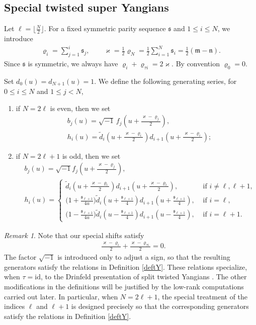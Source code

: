 \documentclass[11pt,reqno]{amsart}
\numberwithin{equation}{section}
\theoremstyle{definition}
\theoremstyle{remark}
\newtheorem{rem}[thm]{Remark}
\newcommand{\fkn}{\mathfrak{n}}
\newcommand{\fkm}{\mathfrak{m}}
\newcommand{\tl}{\tilde}
\newcommand{\lle}{\leqslant}
\newcommand{\ka}{{\mathfrak s}}
\begin{document}
\subsection{Special twisted super Yangians}\label{sec:hb}
Let $\ell=\lfloor\frac{N}{2}\rfloor$. For a fixed symmetric parity sequence $\bm\ka$ and $1\lle i\lle N$, we introduce
\begin{align}\label{eq:rho}
\varrho_i=\sum_{j=1}^i \ka_j,\qquad \varkappa=\frac12\varrho_N=\frac12\sum_{i=1}^N \ka_i=\frac12(\fkm-\fkn).
\end{align}
Since $\bm\ka$ is symmetric, we always have $\varrho_i+\varrho_{\tau i}=2\varkappa$. By convention $\varrho_0=0$.

Set $d_0(u)=d_{N+1}(u)=1$. We define the following generating series, for $0\lle i\lle N$ and $1\lle j< N$,
\begin{enumerate}
    \item if $N=2\ell$ is even, then we set
\begin{align}
& b_j(u)= \sqrt{-1}\,f_j(u+\tfrac{\varkappa-\varrho_j}{2}),\label{beven}\\
& h_i(u)=\tl d_{i}(u+\tfrac{\varkappa-\varrho_i}{2})d_{i+1}(u+\tfrac{\varkappa-\varrho_i}{2})\label{heven};
\end{align}
\item if $N=2\ell+1$ is odd, then we set
\begin{align}
&b_j(u)= \sqrt{-1}f_j(u+\tfrac{\varkappa-\varrho_j}{2}),\label{bodd}\\
&h_i(u)=
\begin{cases}
\tl d_{i}(u+\tfrac{\varkappa-\varrho_i}{2})d_{i+1}(u+\tfrac{\varkappa-\varrho_i}{2}), &\text{ if } i\ne \ell,\ell+1,\\
\big(1+\tfrac{\ka_{\ell+1}}{4u}\big)\tl d_{i}(u+\tfrac{\ka_{\ell+1}}{4})d_{i+1}(u+\tfrac{\ka_{\ell+1}}{4}),& \text{ if } i=\ell,\\
\big(1-\tfrac{\ka_{\ell+1}}{4u}\big)\tl d_{i}(u-\tfrac{\ka_{\ell+1}}{4})d_{i+1}(u-\tfrac{\ka_{\ell+1}}{4}),& \text{ if } i=\ell+1.
\end{cases}\label{hodd}
\end{align}
\end{enumerate}
\begin{rem}
Note that our special shifts satisfy
\begin{align*}
& \frac{\varkappa-\varrho_i}{2}+\frac{\varkappa-\varrho_{\tau i}}{2}=0.
\end{align*}
The factor $\sqrt{-1}$ is introduced only to adjust a sign, so that the resulting generators satisfy the relations in Definition \ref{deftY}. These relations specialize, when $\tau=\mathrm{id}$, to the Drinfeld presentation of split twisted Yangians \cite{Lu2023drinfeld,lu2025affine}. The other modifications in the definitions will be justified by the low-rank computations carried out later. In particular, when $N=2\ell+1$, the special treatment of the indices $\ell$ and $\ell+1$ is designed precisely so that the corresponding generators satisfy the relations in Definition \ref{deftY}.
\end{rem}
\end{document}
